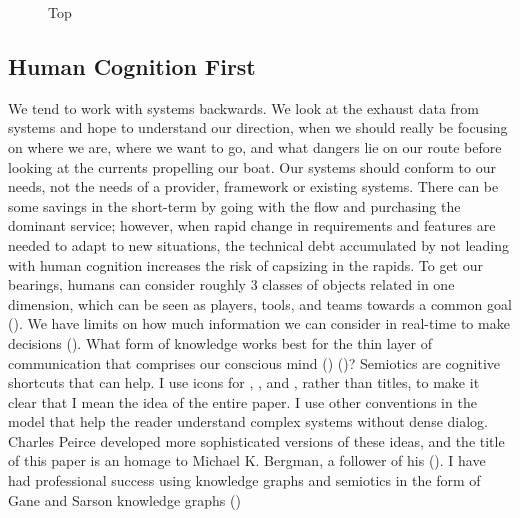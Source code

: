 \begin{wrapfigure}[19]{r}{0pt}

\centering 

\caption{Top}\label{fig:top}

\end{wrapfigure}

\afterpage{\clearpage}

\subsection{Human Cognition First}\label{human-cognition-first}

We tend to work with systems backwards. We look at the exhaust data from
systems and hope to understand our direction, when we should really be
focusing on where we are, where we want to go, and what dangers lie on
our route before looking at the currents propelling our boat. Our
systems should conform to our needs, not the needs of a provider,
framework or existing systems. There can be some savings in the
short-term by going with the flow and purchasing the dominant service;
however, when rapid change in requirements and features are needed to
adapt to new situations, the technical debt accumulated by not leading
with human cognition increases the risk of capsizing in the rapids. To
get our bearings, humans can consider roughly 3 classes of objects
related in one dimension, which can be seen as players, tools, and teams
towards a common goal
(). We
have limits on how much information we can consider in real-time to make
decisions (). What form of knowledge works best for the thin layer of
communication that comprises our conscious mind
()
()?
Semiotics are cognitive shortcuts that can help. I use icons for \tsa,
\trs, and \ada, rather than titles, to make it clear that I mean the
idea of the entire paper. I use other conventions in the model that help
the reader understand complex systems without dense dialog. Charles
Peirce developed more sophisticated versions of these ideas, and the
title of this paper is an homage to Michael K. Bergman, a follower of
his (). I have had
professional success using knowledge graphs and semiotics in the form of
Gane and Sarson knowledge graphs ()
